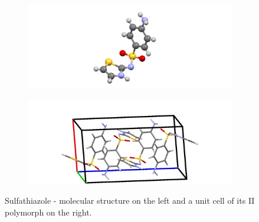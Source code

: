 \begin{figure}[htb!]
	\begin{subfigure}{0.5\textwidth}
		\includegraphics[width=1.2\linewidth]{img/sulfathiazol.png} 
	\end{subfigure}
	\begin{subfigure}{0.5\textwidth}
		\includegraphics[width=1.1\linewidth]{img/sulfathiazol_packing.png}
	\end{subfigure}
	\caption{Sulfathiazole - molecular structure on the left and a unit cell of its II polymorph on the right.}
	\label{fig:sulfathiazole}
\end{figure}


